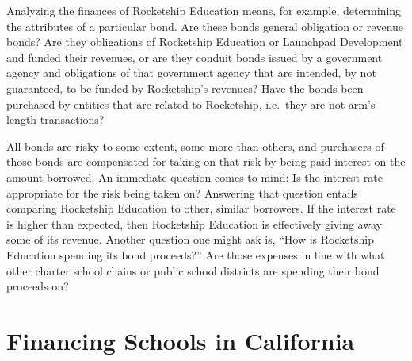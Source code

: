 Analyzing the finances of Rocketship Education means, for example, determining
the attributes of a particular bond. Are these bonds general obligation or revenue bonds? Are they obligations of Rocketship Education or Launchpad Development and funded their revenues, or are they conduit bonds issued by a government agency and obligations of that government agency that are intended, by not guaranteed, to be funded by Rocketship's revenues? Have the bonds been purchased by entities that are related to Rocketship, i.e.~they are not arm's length transactions? 

All bonds are risky to some extent, some more than others, and purchasers of those bonds are compensated for taking on that risk by being paid interest on the amount borrowed. An immediate question comes to mind: Is the interest rate appropriate for the risk being taken on? Answering that question entails comparing Rocketship Education to other, similar borrowers. If the interest rate is higher than expected, then Rocketship Education is effectively giving away some of its revenue. Another question one might ask is, ``How is Rocketship Education spending its bond proceeds?'' Are those expenses in line with what other charter school chains or public school districts are spending their bond proceeds on? %


\section{Financing Schools in California}\label{sec:financing-ca-overview}\indent

